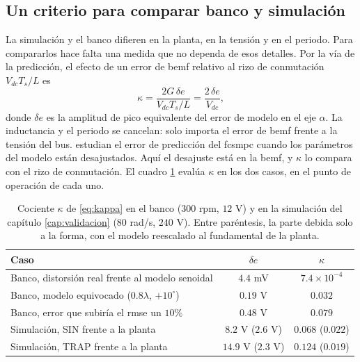 \documentclass[../../../Tesis_JALS_Maestria.tex]{subfiles}
\begin{document}
\subsection{Un criterio para comparar banco y simulación}

La simulación y el banco difieren en la planta, en la tensión y en el periodo. Para compararlos hace falta una medida que no dependa de esos detalles. Por la vía de la predicción, el efecto de un error de \acrshort{bemf} relativo al rizo de conmutación $V_{dc}T_s/L$ es
\begin{equation}
    \kappa = \frac{2G\,\delta e}{V_{dc}T_s/L} = \frac{2\,\delta e}{V_{dc}},
    \label{eq:kappa}
\end{equation}
donde $\delta e$ es la amplitud de pico equivalente del error de modelo en el eje $\alpha$. La inductancia y el periodo se cancelan: solo importa el error de \acrshort{bemf} frente a la tensión del bus. \citet{young2016mismatch} estudian el error de predicción del \acrshort{fcsmpc} cuando los parámetros del modelo están desajustados. Aquí el desajuste está en la \acrshort{bemf}, y $\kappa$ lo compara con el rizo de conmutación. El cuadro \ref{tab:kappa} evalúa $\kappa$ en los dos casos, en el punto de operación de cada uno.

\begin{table}[htbp]
    \centering
    \caption{Cociente $\kappa$ de \eqref{eq:kappa} en el banco ($300$ rpm, $12$ V) y en la simulación del capítulo \ref{cap:validacion} ($80$ rad/s, $240$ V). Entre paréntesis, la parte debida solo a la forma, con el modelo reescalado al fundamental de la planta.}
    \label{tab:kappa}
    \begin{tabular}{lcc}
        \toprule
        Caso & $\delta e$ & $\kappa$ \\
        \midrule
        Banco, distorsión real frente al modelo senoidal & $4.4$ mV & $7.4\times 10^{-4}$ \\
        Banco, modelo equivocado ($0.8\lambda$, $+10^\circ$) & $0.19$ V & $0.032$ \\
        Banco, error que subiría el \acrshort{rmse} un $10\%$ & $0.48$ V & $0.079$ \\
        Simulación, SIN frente a la planta & $8.2$ V ($2.6$ V) & $0.068$ ($0.022$) \\
        Simulación, TRAP frente a la planta & $14.9$ V ($2.3$ V) & $0.124$ ($0.019$) \\
        \bottomrule
    \end{tabular}
\end{table}
\end{document}

